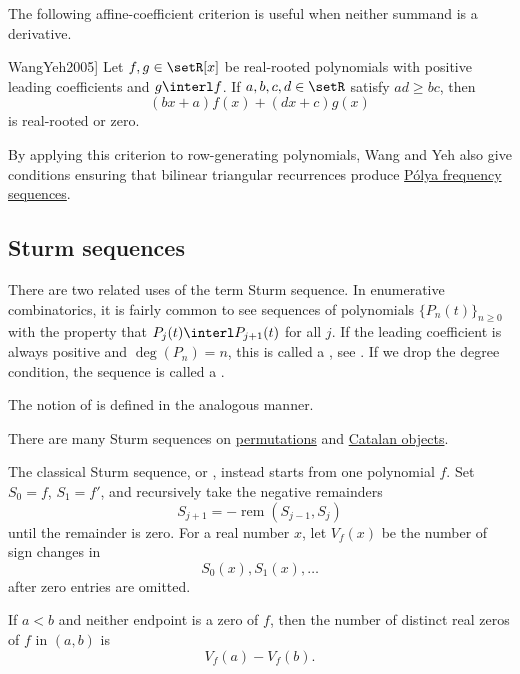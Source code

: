 The following affine-coefficient criterion is useful when neither summand is
a derivative.
\begin{theorem}[Wang--Yeh, 2005, \cite[Thm.~1]{WangYeh2005}]
\label{wangYehAffineCriterion}
Let $f,g\in\setR[x]$ be real-rooted polynomials with positive leading
coefficients and $g\interl f$.  If $a,b,c,d\in\setR$ satisfy $ad\geq bc$, then
\[
  (bx+a)f(x)+(dx+c)g(x)
\]
is real-rooted or zero.
\end{theorem}
By applying this criterion to row-generating polynomials, Wang and Yeh also
give conditions ensuring that bilinear triangular recurrences produce
\hyperref[wangYehPfPreserver]{Pólya frequency sequences}.



\subsection[sturmSequence]{Sturm sequences}


There are two related uses of the term Sturm sequence.  In enumerative
combinatorics, it is fairly common to see sequences of polynomials
$\{ P_n(t) \}_{n \geq 0}$
with the property that $P_j(t) \interl P_{j+1}(t)$ for all $j$.
If the leading coefficient is always positive and $\deg(P_n)=n$,
this is called a \label{sturmSequenceDefinition},
see \cite{LiuWang2007}.
If we drop the degree condition, the sequence is called a
\label{generalizedSturmSequence}.

The notion of \label{sturmUnimodality}
is defined in the analogous manner.



There are many Sturm sequences on \hyperref[realRootedWords]{permutations}
and \hyperref[realRootedCatalan]{Catalan objects}.

The classical Sturm sequence, or , instead starts from one
polynomial $f$.  Set $S_0=f$, $S_1=f'$, and recursively take the negative
remainders
\[
  S_{j+1}=-\operatorname{rem}(S_{j-1},S_j)
\]
until the remainder is zero.  For a real number $x$, let $V_f(x)$ be the
number of sign changes in
\[
  S_0(x),S_1(x),\dotsc
\]
after zero entries are omitted.

\begin{theorem}
\label{sturmRootCounting}
If $a<b$ and neither endpoint is a zero of $f$, then the number of distinct
real zeros of $f$ in $(a,b)$ is
\[
  V_f(a)-V_f(b).
\]
\end{theorem}

